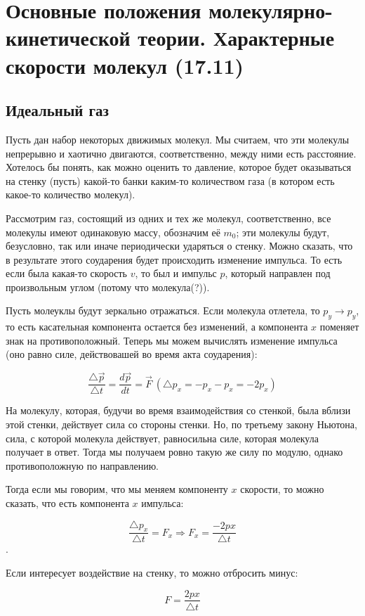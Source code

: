 \section{Основные положения молекулярно-кинетической теории. Характерные скорости молекул (17.11)}
\subsection{Идеальный газ}
Пусть дан набор некоторых движимых молекул. Мы считаем, что эти молекулы непрерывно и хаотично двигаются, соответственно, между ними есть расстояние. Хотелось бы понять, как можно оценить то давление, которое будет оказываться на стенку (пусть) какой-то банки каким-то количеством газа (в котором есть какое-то количество молекул).

Рассмотрим газ, состоящий из одних и тех же молекул, соответственно, все молекулы имеют одинаковую массу, обозначим её $m_0$; эти молекулы будут, безусловно, так или иначе периодически ударяться о стенку. Можно сказать, что в результате этого соударения будет происходить изменение импульса. То есть если была какая-то скорость $v$, то был и импульс $p$, который направлен под произвольным углом (потому что молекула(?)).

Пусть молеуклы будут зеркально отражаться. Если молекула отлетела, то $p_y \rightarrow p_y$, то есть касательная компонента остается без изменений, а компонента $x$ поменяет знак на противоположный. Теперь мы можем вычислять изменение импульса (оно равно силе, действовашей во время акта соударения):

\[\frac{\triangle\vec{p}}{\triangle t} = \frac{d\vec{p}}{dt} = \vec{F} \ (\triangle p_x = -p_x - p_x = -2p_x)\]

На молекулу, которая, будучи во время взаимодействия со стенкой, была вблизи этой стенки, действует сила со стороны стенки. Но, по третьему закону Ньютона, сила, с которой молекула действует, равносильна силе, которая молекула получает в ответ. Тогда мы получаем ровно такую же силу по модулю, однако противоположную по направлению.

Тогда если мы говорим, что мы меняем компоненту $x$ скорости, то можно сказать, что есть компонента $x$ импульса:

\[\frac{\triangle p_x}{\triangle t} = F_x \Rightarrow F_x = \frac{-2px}{\triangle t}\].

Если интересует воздействие на стенку, то можно отбросить минус:

\[F = \frac{2px}{\triangle t}\]

